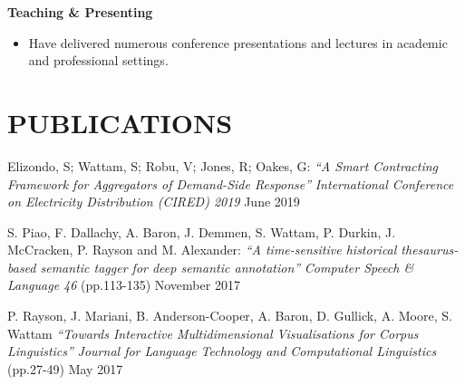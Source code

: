 \documentclass{res}
\begin{document}
\begin{resume}
  {\bf Teaching \& Presenting}
    \begin{itemize}
      \item[] Have delivered numerous conference presentations and lectures in academic and professional settings.
    \end{itemize}



\section{PUBLICATIONS}
\vspace{0.1in}









Elizondo, S; Wattam, S; Robu, V; Jones, R; Oakes, G:
\textsl{``A Smart Contracting Framework for Aggregators of Demand-Side Response''}
\textit{International Conference on Electricity Distribution (CIRED) 2019}
June 2019


S. Piao, F. Dallachy, A. Baron, J. Demmen, S. Wattam, P. Durkin, J. McCracken, P. Rayson and M. Alexander:
\textsl{``A time-sensitive historical thesaurus-based semantic tagger for deep semantic annotation''}
\textit{Computer Speech \& Language 46} (pp.113-135)
November 2017

P. Rayson, J. Mariani, B. Anderson-Cooper, A. Baron, D. Gullick, A. Moore, S. Wattam
\textsl{``Towards Interactive Multidimensional Visualisations for Corpus Linguistics''}
\textit{Journal for Language Technology and Computational Linguistics} (pp.27-49)
May 2017


\end{resume}
\end{document}
